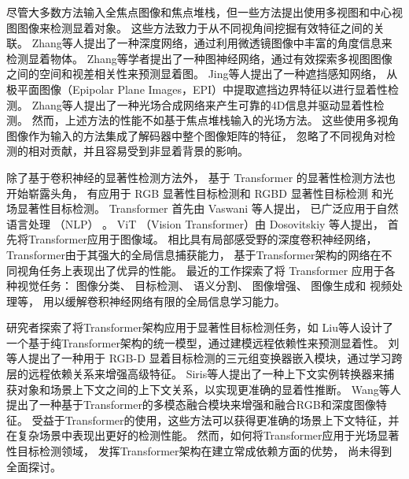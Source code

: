尽管大多数方法输入全焦点图像和焦点堆栈，但一些方法提出使用多视图和中心视图图像来检测显着对象。 
这些方法致力于从不同视角间挖掘有效特征之间的关联。
Zhang等人提出了一种深度网络，通过利用微透镜图像中丰富的角度信息来检测显着物体。 
Zhang等学者提出了一种图神经网络，通过有效探索多视图图像之间的空间和视差相关性来预测显着图。 
Jing等人提出了一种遮挡感知网络，
从极平面图像（Epipolar Plane Images，EPI）中提取遮挡边界特征以进行显着性检测。 
Zhang等人提出了一种光场合成网络来产生可靠的4D信息并驱动显着性检测。 
然而，上述方法的性能不如基于焦点堆栈输入的光场方法。 
这些使用多视角图像作为输入的方法集成了解码器中整个图像矩阵的特征，
忽略了不同视角对检测的相对贡献，并且容易受到非显着背景的影响。 




除了基于卷积神经的显著性检测方法外，
基于 Transformer 的显著性检测方法也开始崭露头角，
有应用于 
RGB 显著性目标检测和 
RGBD 显著性目标检测
和光场显著性目标检测。
Transformer 首先由 Vaswani 等人提出，
已广泛应用于自然语言处理
（NLP）
。
ViT （Vision Transformer）由 Dosovitskiy 等人提出，
首先将Transformer应用于图像域。
相比具有局部感受野的深度卷积神经网络，
Transformer由于其强大的全局信息捕获能力，
基于Transformer架构的网络在不同视角任务上表现出了优异的性能。
最近的工作探索了将 Transformer 应用于各种视觉任务：
图像分类、
目标检测、
语义分割、
图像增强、
图像生成和 
视频处理等，
用以缓解卷积神经网络有限的全局信息学习能力。



研究者探索了将Transformer架构应用于显著性目标检测任务，如
Liu等人设计了一个基于纯Transformer架构的统一模型，通过建模远程依赖性来预测显着性。
刘等人提出了一种用于 RGB-D 显着目标检测的三元组变换器嵌入模块，通过学习跨层的远程依赖关系来增强高级特征。 
Siris等人提出了一种上下文实例转换器来捕获对象和场景上下文之间的上下文关系，以实现更准确的显着性推断。 
Wang等人提出了一种基于Transformer的多模态融合模块来增强和融合RGB和深度图像特征。
受益于Transformer的使用，这些方法可以获得更准确的场景上下文特征，并在复杂场景中表现出更好的检测性能。 然而，如何将Transformer应用于光场显著性目标检测领域，
发挥Transformer架构在建立常成依赖方面的优势，
尚未得到全面探讨。 






